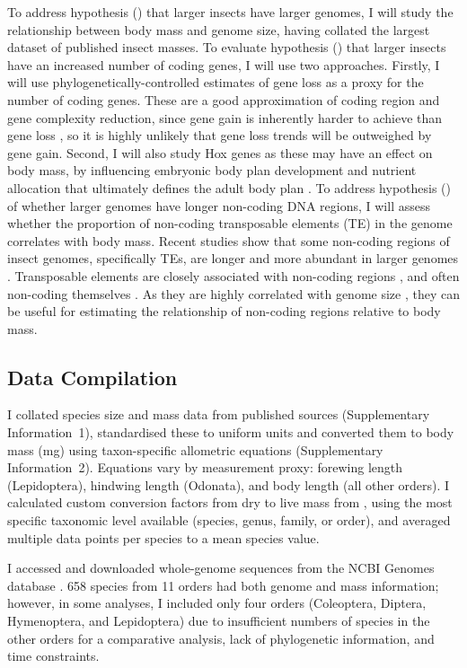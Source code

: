 \documentclass[11pt]{article}
\begin{document}
To address hypothesis () that larger insects have larger genomes, I will study the relationship between body mass and genome size, having collated the largest dataset of published insect masses. To evaluate hypothesis () that larger insects have an increased number of coding genes, I will use two approaches. Firstly, I will use phylogenetically-controlled estimates of gene loss as a proxy for the number of coding genes. These are a good approximation of coding region and gene complexity reduction, since gene gain is inherently harder to achieve than gene loss \citep{gene-loss-vs-gain-2, evolution-by-gene-loss, geneloss_vs_gain}, so it is highly unlikely that gene loss trends will be outweighed by gene gain. Second, I will also study Hox genes as these may have an effect on body mass, by influencing embryonic body plan development and nutrient allocation that ultimately defines the adult body plan \citep{hox-function, hox-length}. To address hypothesis () of whether larger genomes have longer non-coding DNA regions, I will assess whether the proportion of non-coding transposable elements (TE) in the genome correlates with body mass. Recent studies show that some non-coding regions of insect genomes, specifically TEs, are longer and more abundant in larger genomes \citep{repetitions}. Transposable elements are closely associated with non-coding regions \citep{hadji-te-rna}, and often non-coding themselves \citep{noncodingRNADNA}. As they are highly correlated with genome size \citep{600TEs}, they can be useful for estimating the relationship of non-coding regions relative to body mass. 


\subsection{Data Compilation}
I collated species size and mass data from published sources (Supplementary Information~1), standardised these to uniform units and converted them to body mass (mg) using taxon-specific allometric equations (Supplementary Information~2). Equations vary by measurement proxy: forewing length (Lepidoptera), hindwing length (Odonata), and body length (all other orders). I calculated custom conversion factors from dry to live mass from \cite{drylivemass}, using the most specific taxonomic level available (species, genus, family, or order), and averaged multiple data points per species to a mean species value.

I accessed and downloaded whole-genome sequences from the NCBI Genomes database \citep{NCBI_Resource_Coordinators2015-iy}. 658 species from 11 orders had both genome and mass information; however, in some analyses, I included only four orders (Coleoptera, Diptera, Hymenoptera, and Lepidoptera) due to insufficient numbers of species in the other orders for a comparative analysis, lack of phylogenetic information, and time constraints.
\end{document}
